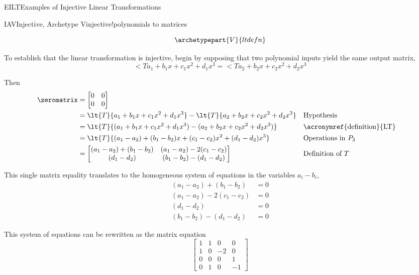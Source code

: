 \begin{subsect}{EILT}{Examples of Injective Linear Transformations}
\begin{example}{IAV}{Injective, Archetype V}{injective!polynomials to matrices}
\begin{para}
\begin{equation*}
\archetypepart{V}{ltdefn}\end{equation*}
\end{para}
%
\begin{para}To establish that the linear transformation is injective, begin by supposing that two polynomial inputs yield the same output matrix,
%
\begin{equation*}
\lt{T}{a_1+b_1x+c_1x^2+d_1x^3}=\lt{T}{a_2+b_2x+c_2x^2+d_2x^3}
\end{equation*}
\end{para}
%
\begin{para}Then
%
\begin{align*}
\zeromatrix
&=\begin{bmatrix}
0&0\\0&0
\end{bmatrix}\\
&=\lt{T}{a_1+b_1x+c_1x^2+d_1x^3}-\lt{T}{a_2+b_2x+c_2x^2+d_2x^3}&&\text{Hypothesis}\\
&=\lt{T}{(a_1+b_1x+c_1x^2+d_1x^3)-(a_2+b_2x+c_2x^2+d_2x^3)}&&\text{\acronymref{definition}{LT}}\\
&=\lt{T}{(a_1-a_2)+(b_1-b_2)x+(c_1-c_2)x^2+(d_1-d_2)x^3}&&\text{Operations in $P_3$}\\
&=
\begin{bmatrix}
(a_1-a_2)+(b_1-b_2) & (a_1-a_2)-2(c_1-c_2)\\
(d_1-d_2) & (b_1-b_2)-(d_1-d_2)
\end{bmatrix}&&\text{Definition of $T$}
%
\end{align*}\end{para}
%
\begin{para}This single matrix equality translates to the homogeneous system of equations in the variables $a_i-b_i$,
%
\begin{align*}
(a_1-a_2)+(b_1-b_2)&=0\\
(a_1-a_2)-2(c_1-c_2)&=0\\
(d_1-d_2)&=0\\
(b_1-b_2)-(d_1-d_2)&=0
\end{align*}
\end{para}
%
\begin{para}This system of equations can be rewritten as the matrix equation
%
\begin{equation*}
\begin{bmatrix}
1&1&0&0\\1&0&-2&0\\0&0&0&1\\0&1&0&-1
\end{bmatrix}

\end{equation*}
\end{para}
\end{example}
\end{subsect}
